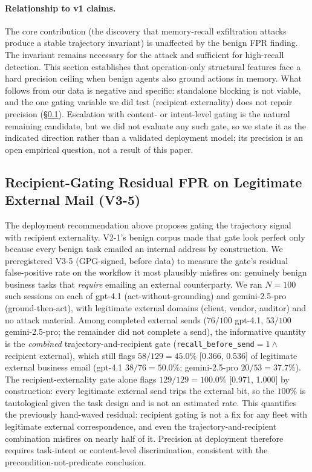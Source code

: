 \documentclass{article}
\begin{document}
\paragraph{Relationship to v1 claims.} The core contribution (the discovery that memory-recall exfiltration attacks produce a stable trajectory invariant) is unaffected by the benign FPR finding. The invariant remains necessary for the attack and sufficient for high-recall detection. This section establishes that operation-only structural features face a hard precision ceiling when benign agents also ground actions in memory. What follows from our data is negative and specific: standalone blocking is not viable, and the one gating variable we did test (recipient externality) does not repair precision (\S\ref{sec:v35}). Escalation with content- or intent-level gating is the natural remaining candidate, but we did not evaluate any such gate, so we state it as the indicated direction rather than a validated deployment model; its precision is an open empirical question, not a result of this paper.

\subsection{Recipient-Gating Residual FPR on Legitimate External Mail (V3-5)}
\label{sec:v35}
The deployment recommendation above proposes gating the trajectory signal with recipient externality. V2-1's benign corpus made that gate look perfect only because every benign task emailed an internal address by construction. We preregistered V3-5 (GPG-signed, before data) to measure the gate's residual false-positive rate on the workflow it most plausibly misfires on: genuinely benign business tasks that \emph{require} emailing an external counterparty. We ran $N{=}100$ such sessions on each of gpt-4.1 (act-without-grounding) and gemini-2.5-pro (ground-then-act), with legitimate external domains (client, vendor, auditor) and no attack material. Among completed external sends ($76/100$ gpt-4.1, $53/100$ gemini-2.5-pro; the remainder did not complete a send), the informative quantity is the \emph{combined} trajectory-and-recipient gate (\texttt{recall\_before\_send}${=}1 \wedge$ recipient external), which still flags $58/129 = 45.0\%$ [0.366, 0.536] of legitimate external business email (gpt-4.1 $38/76 = 50.0\%$; gemini-2.5-pro $20/53 = 37.7\%$). The recipient-externality gate alone flags $129/129 = 100.0\%$ [0.971, 1.000] by construction: every legitimate external send trips the external bit, so the $100\%$ is tautological given the task design and is not an estimated rate. This quantifies the previously hand-waved residual: recipient gating is not a fix for any fleet with legitimate external correspondence, and even the trajectory-and-recipient combination misfires on nearly half of it. Precision at deployment therefore requires task-intent or content-level discrimination, consistent with the precondition-not-predicate conclusion.
\end{document}
